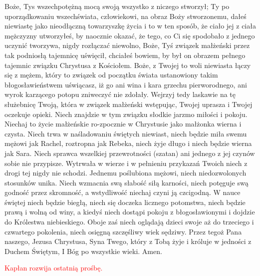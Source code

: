 \begin{Parallel}[v]{0.485\textwidth}{0.485\textwidth}
{Boże, Tys wszechpotężną mocą swoją wszystko z niczego stworzył; Ty po uporządkowaniu wszechświata, człowiekowi, na obraz Boży stworzonemu, dałeś niewiastę jako nieodłączną towarzyszkę życia i to w ten sposób, że ciało jej z ciała mężczyzny utworzyłeś, by naocznie okazać, że tego, co Ci się spodobało z jednego uczynić tworzywa, nigdy rozłączać niewolno, Boże, Tyś związek małżeński przez tak podniosłą tajemnicę uświęcił, chciałeś bowiem, by był on obrazem pełnego tajemnic związku Chrystusa z Kościołem. Boże, z Twojej to woli niewiasta łączy się z mężem, który to związek od początku świata ustanowiony takim błogosławieństwem uświącasz, iż go ani wina i kara grzechu pierworodnego, ani wyrok karzącego potopu zniweczyć nie zdołały. Wejrzyj tedy laskawie na tę służebnicę Twoją, która w związek małżeński wstępując, Twojej uprasza i Twojej oczekuje opieki. Niech znajdzie w tym związku słodkie jarzmo miłości i pokoju. Niechaj to życie małżeńskie ro-zpocznie w Chrystusie jako małżonka wierna i czysta. Niech trwa w naśladowaniu świętych niewiast, niech będzie miła swemu mężowi jak Rachel, roztropna jak Rebeka, niech żyje długo i niech będzie wierna jak Sara. Niech sprawca wszelkiej przewrotności (szatan) ani jednego z jej czynów sobie nie przypisze. Wytrwała w wierze i w pełnieniu przykazań Twoich niech z drogi tej nigdy nie schodzi. Jednemu poślubiona mężowi, niech niedozwolonych stosunków unika. Niech wzmacnia swą słabość siłą karności, niech potęguje swą godność przez skromność, a wstydliwość niechaj czyni ją czcigodną. W nauce świętej niech będzie biegłą, niech się doczeka licznego potomstwa, niech będzie prawą i wolną od winy, a kiedyś niech dostąpi pokoju z błogosławionymi i dojdzie do Królestwa niebieskiego. Oboje zaś niech oglądają dzieci swoje aż do trzeciego i czwartego pokolenia, niech osięgną szczęśliwy wiek sędziwy. Przez tegoż Pana naszego, Jezusa Chrystusa, Syna Twego, który z Tobą żyje i króluje w jedności z Duchem Świętym, I Bóg po wszystkie wieki. Amen.
}
\end{Parallel}

\begin{center}
\textcolor{red}{Kapłan rozwija ostatnią prośbę.}
\end{center}

